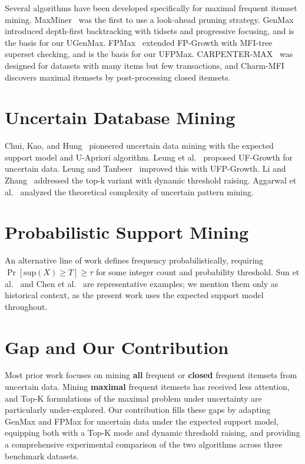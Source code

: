 \documentclass[12pt,a4paper]{report}
\begin{document}
  Several algorithms have been developed specifically for maximal frequent itemset mining. MaxMiner~\cite{bayardo1998} was the first to use a look-ahead pruning strategy. GenMax~\cite{gouda2005} introduced depth-first backtracking with tidsets and progressive focusing, and is the basis for our UGenMax. FPMax~\cite{grahne2003} extended FP-Growth with MFI-tree superset checking, and is the basis for our UFPMax. CARPENTER-MAX~\cite{pan2003} was designed for datasets with many items but few transactions, and Charm-MFI~\cite{szathmary2006} discovers maximal itemsets by post-processing closed itemsets.

  \section{Uncertain Database Mining}

  Chui, Kao, and Hung~\cite{chui2007} pioneered uncertain data mining with the expected support model and U-Apriori algorithm. Leung et al.~\cite{leung2008} proposed UF-Growth for uncertain data. Leung and Tanbeer~\cite{leung2013} improved this with UFP-Growth. Li and Zhang~\cite{li2019} addressed the top-k variant with dynamic threshold raising. Aggarwal et al.~\cite{aggarwal2009} analyzed the theoretical complexity of uncertain pattern mining.

  \section{Probabilistic Support Mining}

  An alternative line of work defines frequency probabilistically, requiring $\Pr[\text{sup}(X) \geq T] \geq \tau$ for some integer count and probability threshold. Sun et al.~\cite{sun2010} and Chen et al.~\cite{chen2020} are representative examples; we mention them only as historical context, as the present work uses the expected support model throughout.

  \section{Gap and Our Contribution}

  Most prior work focuses on mining \textbf{all} frequent or \textbf{closed} frequent itemsets from uncertain data. Mining \textbf{maximal} frequent itemsets has received less attention, and Top-K formulations of the maximal problem under uncertainty are particularly under-explored. Our contribution fills these gaps by adapting GenMax and FPMax for uncertain data under the expected support model, equipping both with a Top-K mode and dynamic threshold raising, and providing a comprehensive experimental comparison of the two algorithms across three benchmark datasets.
\end{document}
